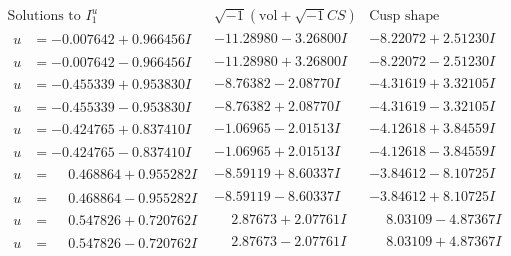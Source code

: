 \documentclass[1p]{elsarticle_modified}
\theoremstyle{definition}
\newcommand{\I}{\sqrt{-1}}
\begin{document}
$$\begin{array}{c|c|c}  
\text{Solutions to }I^u_{1}& \I (\text{vol} + \sqrt{-1}CS) & \text{Cusp shape}\\
 \hline 
\begin{aligned}
u &= -0.007642 + 0.966456 I\end{aligned}
 & -11.28980 - 3.26800 I & -8.22072 + 2.51230 I \\ \hline\begin{aligned}
u &= -0.007642 - 0.966456 I\end{aligned}
 & -11.28980 + 3.26800 I & -8.22072 - 2.51230 I \\ \hline\begin{aligned}
u &= -0.455339 + 0.953830 I\end{aligned}
 & -8.76382 - 2.08770 I & -4.31619 + 3.32105 I \\ \hline\begin{aligned}
u &= -0.455339 - 0.953830 I\end{aligned}
 & -8.76382 + 2.08770 I & -4.31619 - 3.32105 I \\ \hline\begin{aligned}
u &= -0.424765 + 0.837410 I\end{aligned}
 & -1.06965 - 2.01513 I & -4.12618 + 3.84559 I \\ \hline\begin{aligned}
u &= -0.424765 - 0.837410 I\end{aligned}
 & -1.06965 + 2.01513 I & -4.12618 - 3.84559 I \\ \hline\begin{aligned}
u &= \phantom{-}0.468864 + 0.955282 I\end{aligned}
 & -8.59119 + 8.60337 I & -3.84612 - 8.10725 I \\ \hline\begin{aligned}
u &= \phantom{-}0.468864 - 0.955282 I\end{aligned}
 & -8.59119 - 8.60337 I & -3.84612 + 8.10725 I \\ \hline\begin{aligned}
u &= \phantom{-}0.547826 + 0.720762 I\end{aligned}
 & \phantom{-}2.87673 + 2.07761 I & \phantom{-}8.03109 - 4.87367 I \\ \hline\begin{aligned}
u &= \phantom{-}0.547826 - 0.720762 I\end{aligned}
 & \phantom{-}2.87673 - 2.07761 I & \phantom{-}8.03109 + 4.87367 I \\ \hline\begin{aligned}

\end{aligned}
\end{array}$$
\end{document}
